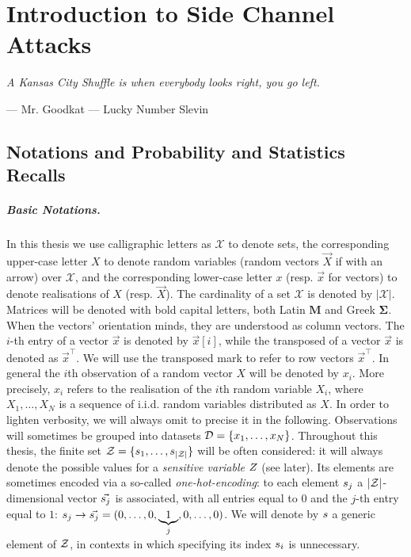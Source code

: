\chapter{Introduction to Side Channel Attacks} %

\label{ChapterIntroductionSCA}
\setlength{\epigraphwidth}{0.3\textwidth}


\epigraph{\textit{A Kansas City Shuffle is when everybody looks right, you go left.}}{--- \textup{Mr. Goodkat --- \textquotedbl Lucky Number Slevin\textquotedbl}}

\section{Notations and Probability and Statistics Recalls}\label{sec:notations}
\paragraph*{Basic Notations.}
In this thesis we use calligraphic letters as $\mathcal{X}$ to denote
sets, the corresponding upper-case letter $X$ to denote random variables (random
vectors $\vec{X}$ if with an arrow) over $\mathcal{X}$, and the corresponding
lower-case letter $x$ (resp. $\vec{x}$ for vectors) to denote realisations of
$X$ (resp. $\vec{X}$). The cardinality of a set $\mathcal{X}$ is denoted by $\lvert\mathcal{X}\rvert$. Matrices will be denoted with bold capital letters, both Latin $\textbf{M}$ and Greek $\boldsymbol{\Sigma}$. When the vectors' orientation minds, they are understood as column vectors. The
$i$-th entry of a vector $\vec{x}$ is denoted by $\vec{x}[i]$, while the transposed of a vector $\vec{x}$ is denoted as $\vec{x}^\intercal$. We will use the transposed mark to refer to row vectors $\vec{x}^\intercal$. In general the $i$th observation of a random vector $X$ will be denoted by $x_i$. More precisely, $x_i$ refers to the realisation of the $i$th random variable $X_i$, where $X_1, \dots , X_N$ is a sequence of i.i.d. random variables distributed as $X$. In order to lighten verbosity, we will always omit to precise it in the following. Observations will sometimes be grouped into datasets $\mathcal{D}=\{x_1,\dots, x_N\}$. Throughout this thesis, the finite set $\mathcal{Z} = \{s_{1}, \dots, s_{\lvert\mathcal{Z}\rvert}\}$ will be often considered: it will always denote the possible values for a \emph{sensitive variable} $Z$ (see later). Its elements are sometimes encoded via a so-called \emph{one-hot-encoding}: to each element $s_{j}$ a $\lvert\mathcal{Z}\rvert$-dimensional vector  $\vec{s_{j}}$ is associated,
with all entries equal to $0$ and the $j$-th entry equal to $1$: $s_{j}
\rightarrow \vec{s_{j}} = (0,\ldots , 0,\underbrace{1}_{j},0,\dots,0)$. We will denote by $s$ a generic element of $\mathcal{Z}$, in contexts in which specifying its index $s_{i}$ is unnecessary.

